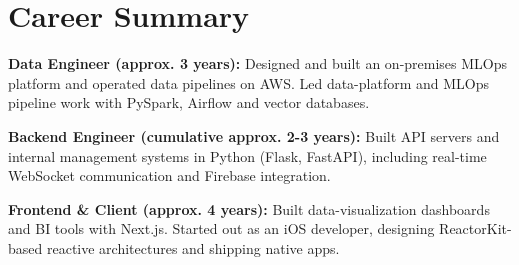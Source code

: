\section{Career Summary}
\begin{itemize}[leftmargin=0.15in, label={}]
	\small{\item{
        \textbf{Data Engineer (approx. 3 years):} Designed and built an on-premises MLOps platform and operated data pipelines on AWS. Led data-platform and MLOps pipeline work with PySpark, Airflow and vector databases.
        }}
        \small{\item{
        \textbf{Backend Engineer (cumulative approx. 2-3 years):} Built API servers and internal management systems in Python (Flask, FastAPI), including real-time WebSocket communication and Firebase integration.
        }}
        \small{\item{
        \textbf{Frontend \& Client (approx. 4 years):} Built data-visualization dashboards and BI tools with Next.js. Started out as an iOS developer, designing ReactorKit-based reactive architectures and shipping native apps.
        }}
\end{itemize}